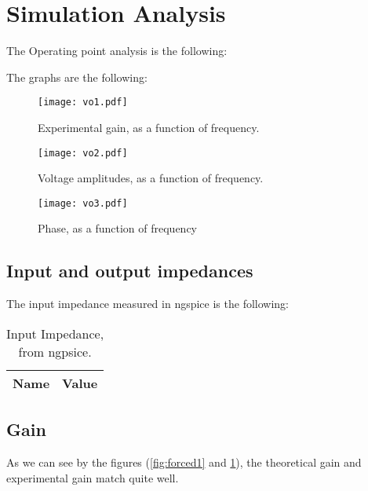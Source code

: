 \section{Simulation Analysis}
\label{sec:simulation}

The Operating point analysis is the following:


The graphs are the following:


\begin{figure}[H] \centering
\texttt{[image: vo1.pdf]}
\caption{Experimental gain, as a function of frequency.}
\label{fig:acm1}
\end{figure}


\begin{figure}[H] \centering
\texttt{[image: vo2.pdf]}
\caption{Voltage amplitudes, as a function of frequency.}
\label{fig:acm2}
\end{figure}


\begin{figure}[H] \centering
\texttt{[image: vo3.pdf]}
\caption{Phase, as a function of frequency}
\label{fig:acm}
\end{figure}

\subsection{Input and output impedances}
The input impedance measured in ngspice is the following:

\begin{table}[H]
  \centering
  \begin{tabular}{|l|r|}
    \hline    
    {\bf Name} & {\bf Value } \\ \hline
    
  \end{tabular}
  \caption{Input Impedance, from ngpsice.}
  \label{tab:op}
\end{table}

\subsection{Gain}
As we can see by the figures (\ref{fig:forced1} and \ref{fig:acm1}), the theoretical gain and experimental gain match quite well.

